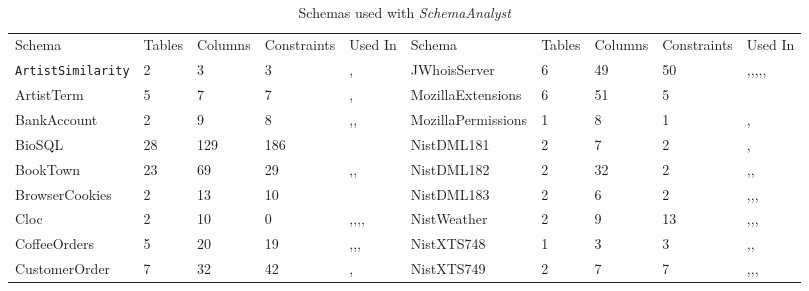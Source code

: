 \begin{table*}[t]
  \scriptsize
  \centering
  \caption{Schemas used with \textit{SchemaAnalyst}}~\label{tab:schemas}
  \begin{tabular}{llllllllll}
    Schema&Tables&Columns&Constraints&Used In&Schema&Tables&Columns&Constraints&Used In \\
    {\tt ArtistSimilarity}&2&3&3&\cite{wright2014impact},\cite{mcminn2015effectiveness}&
    JWhoisServer&6&49&50&\cite{mcminn2016virtual},\cite{kapfhammer2013search},\cite{wright2013efficient},\cite{wright2014impact},\cite{mcminn2015effectiveness},\cite{kinneer2015automatically}\\
    ArtistTerm&5&7&7&\cite{wright2014impact},\cite{mcminn2015effectiveness}&
    MozillaExtensions&6&51&5&\cite{mcminn2015effectiveness} \\
    BankAccount&2&9&8&\cite{kapfhammer2013search},\cite{wright2014impact},\cite{mcminn2015effectiveness}&
    MozillaPermissions&1&8&1&\cite{mcminn2016virtual},\cite{mcminn2015effectiveness}\\
    BioSQL&28&129&186&\cite{kinneer2015automatically}&
    NistDML181&2&7&2&\cite{kapfhammer2013search},\cite{mcminn2015effectiveness}  \\
    BookTown&23&69&29&\cite{kapfhammer2013search},\cite{wright2014impact},\cite{mcminn2015effectiveness}&
    NistDML182&2&32&2&\cite{kapfhammer2013search},\cite{wright2013efficient},\cite{mcminn2015effectiveness}  \\
    BrowserCookies&2&13&10&\cite{mcminn2015effectiveness}&
    NistDML183&2&6&2&\cite{kapfhammer2013search},\cite{wright2013efficient},\cite{wright2014impact},\cite{mcminn2015effectiveness}  \\
    Cloc&2&10&0&\cite{kapfhammer2013search},\cite{wright2013efficient},\cite{wright2014impact},\cite{mcminn2015effectiveness},\cite{kinneer2015automatically}&
    NistWeather&2&9&13&\cite{mcminn2016virtual},\cite{kapfhammer2013search},\cite{mcminn2015effectiveness},\cite{kinneer2015automatically}\\
    CoffeeOrders&5&20&19&\cite{mcminn2016virtual},\cite{kapfhammer2013search},\cite{wright2014impact},\cite{mcminn2015effectiveness}&
    NistXTS748&1&3&3&\cite{kapfhammer2013search},\cite{mcminn2015effectiveness},\cite{kinneer2015automatically} \\
    CustomerOrder&7&32&42&\cite{kapfhammer2013search},\cite{mcminn2015effectiveness}&
    NistXTS749&2&7&7&\cite{kapfhammer2013search},\cite{wright2014impact},\cite{mcminn2015effectiveness},\cite{kinneer2015automatically} \\

\end{tabular}
\end{table*}
